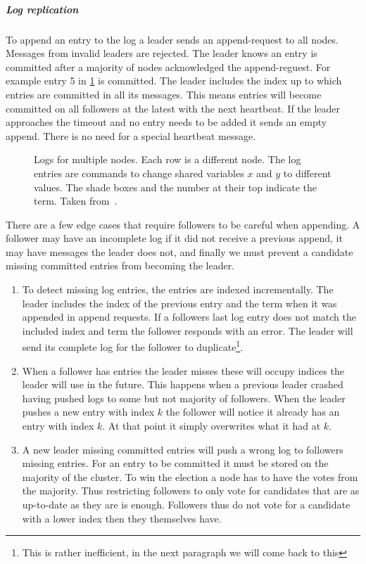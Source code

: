 \subparagraph{Log replication}
To append an entry to the log a leader sends an append-request to all nodes. Messages from invalid leaders  are rejected. The leader knows an entry is committed after a majority of nodes acknowledged the append-reguest. For example entry 5 in \cref{fig:raft_entries} is committed. The leader includes the index up to which entries are committed in all its messages. This means entries will become committed on all followers at the latest with the next heartbeat. If the leader approaches the timeout and no entry needs to be added it sends an empty append. There is no need for a special heartbeat message.

\begin{figure}[htbp]
	\centering
	
	\caption{Logs for multiple nodes. Each row is a different node. The log entries are commands to change shared variables $x$ and $y$ to different values. The shade boxes and the number at their top indicate the term. Taken from~\cite{raft}.}
	\label{fig:raft_entries}
\end{figure}

There are a few edge cases that require followers to be careful when appending. A follower may have an incomplete log if it did not receive a previous append, it may have messages the leader does not, and finally we must prevent a candidate missing committed entries from becoming the leader.
%
\begin{enumerate}
	\item To detect missing log entries, the entries are indexed incrementally. The leader includes the index of the previous entry and the term when it was appended in append requests. If a followers last log entry does not match the included index and term the follower responds with an error. The leader will send its complete log for the follower to duplicate\footnote{This is rather inefficient, in the next paragraph we will come back to this}.
	\item When a follower has entries the leader misses these will occupy indices the leader will use in the future. This happens when a previous leader crashed having pushed logs to some but not majority of followers. When the leader pushes a new entry with index $k$ the follower will notice it already has an entry with index $k$. At that point it simply overwrites what it had at $k$.
	\item A new leader missing committed entries will push a wrong log to followers missing entries. For an entry to be committed it must be stored on the majority of the cluster. To win the election a node has to have the votes from the majority. Thus restricting followers to only vote for candidates that are as up-to-date as they are is enough. Followers thus do not vote for a candidate with a lower index then they themselves have.
\end{enumerate}

